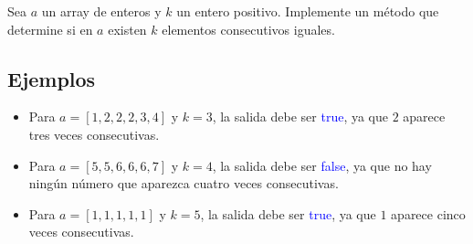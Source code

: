 Sea \( a \) un array de enteros y \( k \) un entero positivo. Implemente un método que determine si en \( a \) existen \( k \) elementos consecutivos iguales.

\subsection*{Ejemplos}

\begin{itemize}
    \item Para \( a = [1, 2, 2, 2, 3, 4] \) y \( k = 3 \), la salida debe ser \textcolor{blue}{true}, ya que \( 2 \) aparece tres veces consecutivas.
    \item Para \( a = [5, 5, 6, 6, 6, 7] \) y \( k = 4 \), la salida debe ser \textcolor{blue}{false}, ya que no hay ningún número que aparezca cuatro veces consecutivas.
    \item Para \( a = [1, 1, 1, 1, 1] \) y \( k = 5 \), la salida debe ser \textcolor{blue}{true}, ya que \( 1 \) aparece cinco veces consecutivas.
\end{itemize}